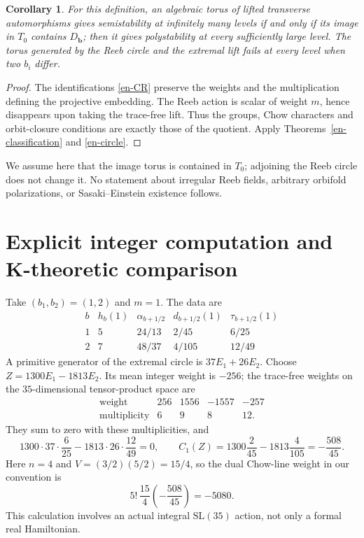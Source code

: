 \documentclass[12pt]{amsart}
\newtheorem{cor}[thm]{Corollary}
\theoremstyle{definition}
\theoremstyle{remark}
\numberwithin{equation}{section}
\begin{document}
\begin{cor}\label{en-sasaki}
For this definition, an algebraic torus of lifted transverse automorphisms gives semistability at infinitely many levels if and only if its image in $T_0$ contains $D_{\boldsymbol b}$; then it gives polystability at every sufficiently large level. The torus generated by the Reeb circle and the extremal lift fails at every level when two $b_i$ differ.
\end{cor}
\begin{proof}
The identifications \eqref{en-CR} preserve the weights and the multiplication defining the projective embedding. The Reeb action is scalar of weight $m$, hence disappears upon taking the trace-free lift. Thus the groups, Chow characters and orbit-closure conditions are exactly those of the quotient. Apply Theorems~\ref{en-classification} and \ref{en-circle}.
\end{proof}
We assume here that the image torus is contained in $T_0$; adjoining the Reeb circle does not change it. No statement about irregular Reeb fields, arbitrary orbifold polarizations, or Sasaki--Einstein existence follows.

\section{Explicit integer computation and K-theoretic comparison}

Take $(b_1,b_2)=(1,2)$ and $m=1$. The data are
\[
\begin{array}{c|cccc}
 b&h_b(1)&\alpha_{b+1/2}&d_{b+1/2}(1)&\tau_{b+1/2}(1)\\ \hline
 1&5&24/13&2/45&6/25\\
 2&7&48/37&4/105&12/49
\end{array}
\]
A primitive generator of the extremal circle is $37E_1+26E_2$. Choose $Z=1300E_1-1813E_2$. Its mean integer weight is $-256$; the trace-free weights on the $35$-dimensional tensor-product space are
\[
\begin{array}{c|rrrr}
\text{weight}&256&1556&-1557&-257\\
\text{multiplicity}&6&9&8&12 .
\end{array}
\]
They sum to zero with these multiplicities, and
\[
1300\cdot37\cdot\frac6{25}
-1813\cdot26\cdot\frac{12}{49}=0,\qquad
C_1(Z)=1300\frac2{45}-1813\frac4{105}=-\frac{508}{45}.
\]
Here $n=4$ and $V=(3/2)(5/2)=15/4$, so the dual Chow-line weight in our convention is
\begin{equation}\label{en-integerweight}
 5!\,\frac{15}{4}\left(-\frac{508}{45}\right)=-5080.
\end{equation}
This calculation involves an actual integral $\mathrm{SL}(35)$ action, not only a formal real Hamiltonian.
\end{document}
